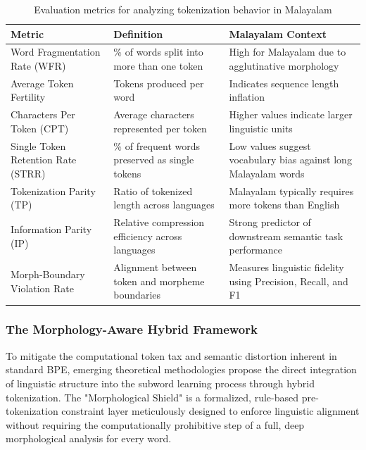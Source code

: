 \documentclass[12pt]{article}
\begin{document}
\begin{table}[H]
\centering
\renewcommand{\arraystretch}{1.2}
\begin{tabularx}{\textwidth}{l X X}
\toprule
\textbf{Metric} & \textbf{Definition} & \textbf{Malayalam Context} \\
\midrule

Word Fragmentation Rate (WFR) 
& \% of words split into more than one token 
& High for Malayalam due to agglutinative morphology \\

Average Token Fertility 
& Tokens produced per word 
& Indicates sequence length inflation \\

Characters Per Token (CPT) 
& Average characters represented per token 
& Higher values indicate larger linguistic units \\

Single Token Retention Rate (STRR) 
& \% of frequent words preserved as single tokens 
& Low values suggest vocabulary bias against long Malayalam words \\

Tokenization Parity (TP) 
& Ratio of tokenized length across languages 
& Malayalam typically requires more tokens than English \\

Information Parity (IP) 
& Relative compression efficiency across languages 
& Strong predictor of downstream semantic task performance \\

Morph-Boundary Violation Rate 
& Alignment between token and morpheme boundaries 
& Measures linguistic fidelity using Precision, Recall, and F1 \\

\bottomrule
\end{tabularx}
\caption{Evaluation metrics for analyzing tokenization behavior in Malayalam}
\end{table}




\newpage



\subsubsection{The Morphology-Aware Hybrid Framework }

To mitigate the computational token tax and semantic distortion inherent in standard BPE, emerging theoretical methodologies propose the direct integration of linguistic structure into the subword learning process through hybrid tokenization. The "Morphological Shield" is a formalized, rule-based pre-tokenization constraint layer meticulously designed to enforce linguistic alignment without requiring the computationally prohibitive step of a full, deep morphological analysis for every word. 
\end{document}
